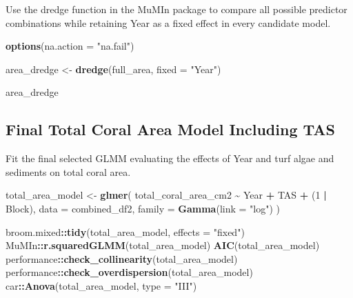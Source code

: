 \documentclass[
]{article}
\newenvironment{Shaded}{\begin{snugshade}}{\end{snugshade}}
\newcommand{\AttributeTok}[1]{\textcolor[rgb]{0.13,0.29,0.53}{#1}}
\newcommand{\DecValTok}[1]{\textcolor[rgb]{0.00,0.00,0.81}{#1}}
\newcommand{\FunctionTok}[1]{\textcolor[rgb]{0.13,0.29,0.53}{\textbf{#1}}}
\newcommand{\NormalTok}[1]{#1}
\newcommand{\OtherTok}[1]{\textcolor[rgb]{0.56,0.35,0.01}{#1}}
\newcommand{\SpecialCharTok}[1]{\textcolor[rgb]{0.81,0.36,0.00}{\textbf{#1}}}
\newcommand{\StringTok}[1]{\textcolor[rgb]{0.31,0.60,0.02}{#1}}
\begin{document}
Use the dredge function in the MuMIn package to compare all possible
predictor combinations while retaining Year as a fixed effect in every
candidate model.

\begin{Shaded}
\begin{Highlighting}[]
\FunctionTok{options}\NormalTok{(}\AttributeTok{na.action =} \StringTok{"na.fail"}\NormalTok{)}

\NormalTok{area\_dredge }\OtherTok{\textless{}{-}} \FunctionTok{dredge}\NormalTok{(full\_area, }\AttributeTok{fixed =} \StringTok{"Year"}\NormalTok{)}

\NormalTok{area\_dredge}
\end{Highlighting}
\end{Shaded}

\subsection{Final Total Coral Area Model Including
TAS}\label{final-total-coral-area-model-including-tas}

Fit the final selected GLMM evaluating the effects of Year and turf
algae and sediments on total coral area.

\begin{Shaded}
\begin{Highlighting}[]
\NormalTok{total\_area\_model }\OtherTok{\textless{}{-}} \FunctionTok{glmer}\NormalTok{(}
\NormalTok{  total\_coral\_area\_cm2 }\SpecialCharTok{\textasciitilde{}}
\NormalTok{    Year }\SpecialCharTok{+}
\NormalTok{    TAS }\SpecialCharTok{+}
\NormalTok{    (}\DecValTok{1} \SpecialCharTok{|}\NormalTok{ Block),}
  \AttributeTok{data =}\NormalTok{ combined\_df2,}
  \AttributeTok{family =} \FunctionTok{Gamma}\NormalTok{(}\AttributeTok{link =} \StringTok{"log"}\NormalTok{)}
\NormalTok{)}

\NormalTok{broom.mixed}\SpecialCharTok{::}\FunctionTok{tidy}\NormalTok{(total\_area\_model, }\AttributeTok{effects =} \StringTok{"fixed"}\NormalTok{)}
\NormalTok{MuMIn}\SpecialCharTok{::}\FunctionTok{r.squaredGLMM}\NormalTok{(total\_area\_model)}
\FunctionTok{AIC}\NormalTok{(total\_area\_model)}
\NormalTok{performance}\SpecialCharTok{::}\FunctionTok{check\_collinearity}\NormalTok{(total\_area\_model)}
\NormalTok{performance}\SpecialCharTok{::}\FunctionTok{check\_overdispersion}\NormalTok{(total\_area\_model)}
\NormalTok{car}\SpecialCharTok{::}\FunctionTok{Anova}\NormalTok{(total\_area\_model, }\AttributeTok{type =} \StringTok{"III"}\NormalTok{)}
\end{Highlighting}
\end{Shaded}
\end{document}
